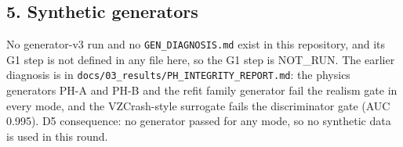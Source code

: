 


\subsection*{5. Synthetic generators}

No generator-v3 run and no \texttt{GEN\_DIAGNOSIS.md} exist in this repository, and its G1 step is not defined in any file here, so the G1 step is NOT\_RUN. The earlier diagnosis is in \texttt{docs/03\_results/PH\_INTEGRITY\_REPORT.md}: the physics generators PH-A and PH-B and the refit family generator fail the realism gate in every mode, and the VZCrash-style surrogate fails the discriminator gate (AUC 0.995). D5 consequence: no generator passed for any mode, so no synthetic data is used in this round.


